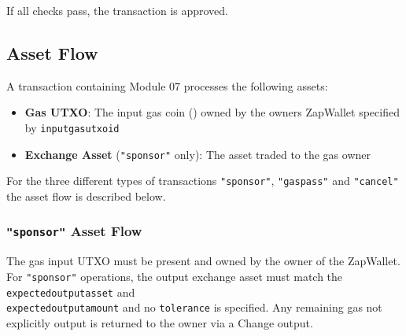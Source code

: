 If all checks pass, the transaction is approved.\\



\subsection{Asset Flow}
A transaction containing Module 07 processes the following assets:

\begin{itemize}
\item \textbf{Gas UTXO}: The input gas coin () owned by the owners ZapWallet specified by \texttt{inputgasutxoid}
\item \textbf{Exchange Asset} (\texttt{"sponsor"} only): The asset traded to the gas owner
\end{itemize}

For the three different types of transactions \texttt{"sponsor"}, \texttt{"gaspass"} and \texttt{"cancel"} the asset flow is described below.\\


\subsubsection{\texttt{"sponsor"} Asset Flow}

The gas input UTXO must be present and owned by the owner of the ZapWallet. For \texttt{"sponsor"}
operations, the output exchange asset must match the \texttt{expectedoutputasset} and \\
\texttt{expectedoutputamount} and no \texttt{tolerance} is specified. Any remaining gas not explicitly output is returned
to the owner via a Change output.\\

